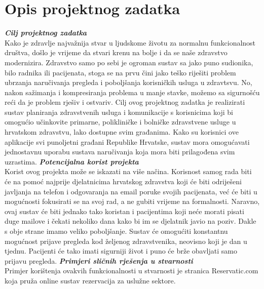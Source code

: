 \chapter{Opis projektnog zadatka}
		
		\textbf{\textit{Cilj projektnog zadatka}}\\
		
		\texttt{}{Kako je zdravlje najvažnija stvar u ljudskome životu za normalnu funkcionalnost društva, došlo je vrijeme da stvari krenu na bolje i da se naše zdravstvo modernizira. Zdravstvo samo po sebi je ogroman sustav sa jako puno sudionika, bilo radnika ili pacijenata, stoga se na prvu čini jako teško riješiti problem ubrzanja naručivanja pregleda i poboljšanja korisničkih usluga u zdravtsvu. No, nakon sažimanja i kompresiranja problema u manje stavke, možemo sa sigurnošću reći da je problem rješiv i ostvariv. Cilj ovog projektnog zadatka je realizirati sustav planiranja zdravstvenih usluga i komunikacije s 
korisnicima koji bi omogućio učinkovite primarne, polikliničke i bolničke zdravstvene usluge u hrvatskom zdravstvu, lako dostupne svim građanima. Kako su korisnici ove aplikacije svi punoljetni građani Republike Hrvatske, sustav mora omogućavati jednostavnu uporabu sustava naručivanja koja mora biti prilagođena svim uzrastima.  } \newline \newline
            \textbf{\textit{Potencijalna korist projekta}}\\ 
            \newline
            \texttt{}{Korist ovog projekta može se iskazati na više načina. Korisnost samog rada biti će na pomoć najprije djelatnicima hrvatskog zdravstva koji će biti odriješeni javljanja na telefon i odgovaranja na email poruke svojih pacijenata, već će biti u mogućnosti fokusirati se na svoj rad, a ne gubiti vrijeme na formalnosti. Naravno, ovaj sustav će biti jednako tako koristan i pacijentima koji neće morati pisati duge mailove i čekati nekoliko dana kako bi im se djelatnik javio na poziv. Dakle s obje strane imamo veliko poboljšanje. Sustav će omogućiti konstantnu mogućnost prijave pregleda kod željenog zdravstvenika, neovisno koji je dan u tjednu. Pacijenti će tako imati sigurniji život i puno će brže obavljati samo prijavu pregleda. }
             \newline
            \eject
            \textbf{\textit{Primjeri sličnih rješenja u stvarnosti}}\\
            \newline
            \texttt{}{Primjer korištenja ovakvih funkcionalnosti u stvarnosti je stranica Reservatic.com koja pruža online sustav rezervacija za uslužne sektore. }
            \newline
             

